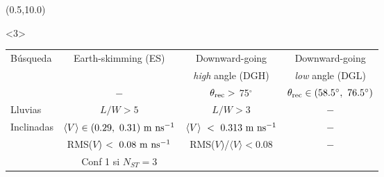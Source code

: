 \begin{frame}
\begin{center}
\begin{textblock}{8.1}
\begin{overprint}
			\end{overprint}
		\end{textblock}
		\begin{textblock}{15}(0.5,10.0)
			\begin{exampleblock}{}<3>
			\renewcommand{\arraystretch}{1.4}
			\scriptsize
			\centering
			\begin{tabular}{|l|c|c|c|}
			\hline
			Búsqueda & Earth-skimming (ES)           & Downward-going                        & Downward-going                       \\
					&                               & {\it high} angle (DGH)                & {\it low} angle (DGL)                \\
			\hline
						& $-$                             & $\theta_{\rm rec}>$ 75$^{\circ}$   &   $\theta_{\rm rec}\in (58.5^\circ,~76.5^{\circ})$\\
			Lluvias    & $L/W > 5$                                         & $L/W > 3$ & $-$ \\
			Inclinadas & $\langle V\rangle\in (0.29,~0.31)~{\rm m~ns^{-1}}$ & $\langle V \rangle~<~0.313~{\rm m~ns^{-1}}$ & $-$ \\
					& RMS($V$)$~<~0.08~{\rm m~ns^{-1}}$                 & RMS($V$)/$\langle V\rangle<0.08$ & $-$ \\
					& Conf 1 si $N_{ST}=3$ & & \\
			\hline
			\end{tabular}
			\end{exampleblock}
		\end{textblock}
	\end{center}
\end{frame}

